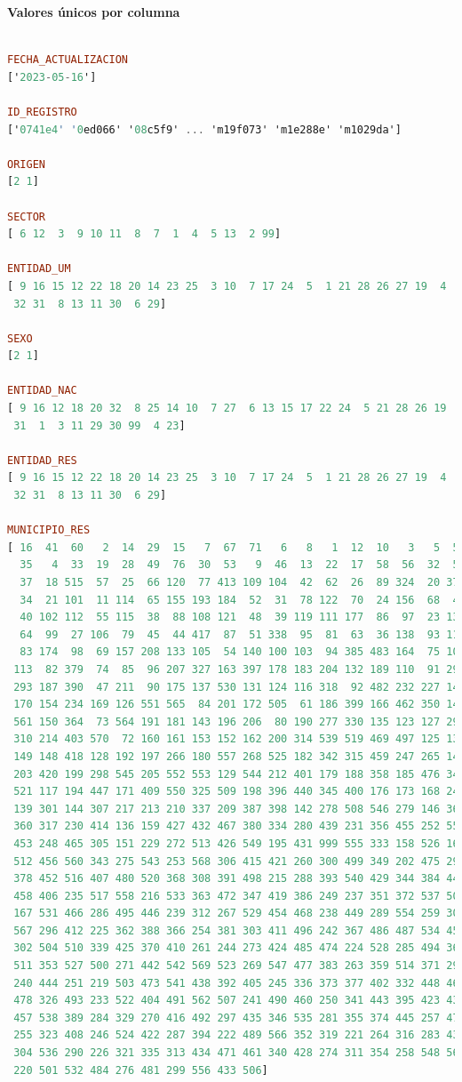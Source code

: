 \textbf{Valores únicos por columna}
\begin{lstlisting}[language=haskell, caption=Valores por columna, captionpos=b, label=lst:fiboHaskell]

FECHA_ACTUALIZACION
['2023-05-16']

ID_REGISTRO
['0741e4' '0ed066' '08c5f9' ... 'm19f073' 'm1e288e' 'm1029da']

ORIGEN
[2 1]

SECTOR
[ 6 12  3  9 10 11  8  7  1  4  5 13  2 99]

ENTIDAD_UM
[ 9 16 15 12 22 18 20 14 23 25  3 10  7 17 24  5  1 21 28 26 27 19  4  2
 32 31  8 13 11 30  6 29]

SEXO
[2 1]

ENTIDAD_NAC
[ 9 16 12 18 20 32  8 25 14 10  7 27  6 13 15 17 22 24  5 21 28 26 19  2
 31  1  3 11 29 30 99  4 23]

ENTIDAD_RES
[ 9 16 15 12 22 18 20 14 23 25  3 10  7 17 24  5  1 21 28 26 27 19  4  2
 32 31  8 13 11 30  6 29]

MUNICIPIO_RES
[ 16  41  60   2  14  29  15   7  67  71   6   8   1  12  10   3   5  59
  35   4  33  19  28  49  76  30  53   9  46  13  22  17  58  56  32  50
  37  18 515  57  25  66 120  77 413 109 104  42  62  26  89 324  20 375
  34  21 101  11 114  65 155 193 184  52  31  78 122  70  24 156  68  43
  40 102 112  55 115  38  88 108 121  48  39 119 111 177  86  97  23 134
  64  99  27 106  79  45  44 417  87  51 338  95  81  63  36 138  93 118
  83 174  98  69 157 208 133 105  54 140 100 103  94 385 483 164  75 107
 113  82 379  74  85  96 207 327 163 397 178 183 204 132 189 110  91 294
 293 187 390  47 211  90 175 137 530 131 124 116 318  92 482 232 227 141
 170 154 234 169 126 551 565  84 201 172 505  61 186 399 166 462 350 145
 561 150 364  73 564 191 181 143 196 206  80 190 277 330 135 123 127 295
 310 214 403 570  72 160 161 153 152 162 200 314 539 519 469 497 125 130
 149 148 418 128 192 197 266 180 557 268 525 182 342 315 459 247 265 147
 203 420 199 298 545 205 552 553 129 544 212 401 179 188 358 185 476 348
 521 117 194 447 171 409 550 325 509 198 396 440 345 400 176 173 168 243
 139 301 144 307 217 213 210 337 209 387 398 142 278 508 546 279 146 369
 360 317 230 414 136 159 427 432 467 380 334 280 439 231 356 455 252 559
 453 248 465 305 151 229 272 513 426 549 195 431 999 555 333 158 526 165
 512 456 560 343 275 543 253 568 306 415 421 260 300 499 349 202 475 291
 378 452 516 407 480 520 368 308 391 498 215 288 393 540 429 344 384 441
 458 406 235 517 558 216 533 363 472 347 419 386 249 237 351 372 537 502
 167 531 466 286 495 446 239 312 267 529 454 468 238 449 289 554 259 309
 567 296 412 225 362 388 366 254 381 303 411 496 242 367 486 487 534 450
 302 504 510 339 425 370 410 261 244 273 424 485 474 224 528 285 494 365
 511 353 527 500 271 442 542 569 523 269 547 477 383 263 359 514 371 292
 240 444 251 219 503 473 541 438 392 405 245 336 373 377 402 332 448 463
 478 326 493 233 522 404 491 562 507 241 490 460 250 341 443 395 423 437
 457 538 389 284 329 270 416 492 297 435 346 535 281 355 374 445 257 470
 255 323 408 246 524 422 287 394 222 489 566 352 319 221 264 316 283 436
 304 536 290 226 321 335 313 434 471 461 340 428 274 311 354 258 548 563
 220 501 532 484 276 481 299 556 433 506]


\end{lstlisting}
